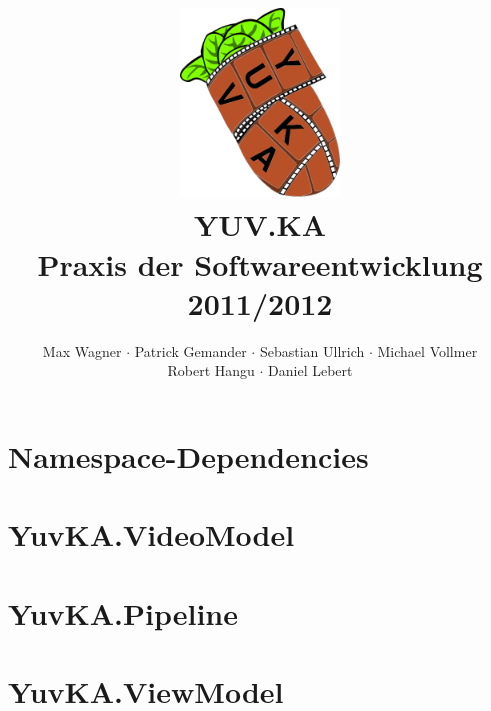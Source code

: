 \documentclass{scrartcl}
\begin{document}
\title{
    \hspace{-0.5cm} \includegraphics[height=5cm]{logo.png} \\[1cm]
    \Huge{YUV.KA} \\ \large{Praxis der Softwareentwicklung 2011/2012}
}
\author{Max Wagner $\cdot$ Patrick Gemander $\cdot$ Sebastian Ullrich $\cdot$ Michael Vollmer \\ Robert Hangu $\cdot$ Daniel Lebert}
\maketitle

\newpage
\mbox{}
\newpage
\mbox{}

\tableofcontents

\section{Namespace-Dependencies}

\clearpage

\section{YuvKA.VideoModel}

\clearpage

\section{YuvKA.Pipeline}

\clearpage






\section{YuvKA.ViewModel}

\clearpage




\end{document}
